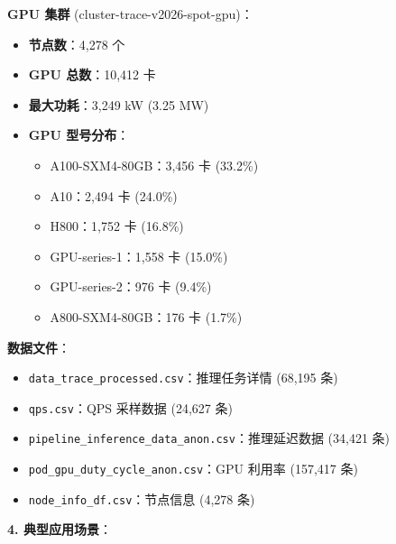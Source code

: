 \documentclass[12pt,a4paper]{article}
\begin{document}
\textbf{GPU 集群} (cluster-trace-v2026-spot-gpu)：
\begin{itemize}
    \item \textbf{节点数}：4,278 个
    \item \textbf{GPU 总数}：10,412 卡
    \item \textbf{最大功耗}：3,249 kW (3.25 MW)
    \item \textbf{GPU 型号分布}：
    \begin{itemize}
        \item A100-SXM4-80GB：3,456 卡 (33.2\%)
        \item A10：2,494 卡 (24.0\%)
        \item H800：1,752 卡 (16.8\%)
        \item GPU-series-1：1,558 卡 (15.0\%)
        \item GPU-series-2：976 卡 (9.4\%)
        \item A800-SXM4-80GB：176 卡 (1.7\%)
    \end{itemize}
\end{itemize}

\textbf{数据文件}：
\begin{itemize}
    \item \texttt{data\_trace\_processed.csv}：推理任务详情 (68,195 条)
    \item \texttt{qps.csv}：QPS 采样数据 (24,627 条)
    \item \texttt{pipeline\_inference\_data\_anon.csv}：推理延迟数据 (34,421 条)
    \item \texttt{pod\_gpu\_duty\_cycle\_anon.csv}：GPU 利用率 (157,417 条)
    \item \texttt{node\_info\_df.csv}：节点信息 (4,278 条)
\end{itemize}

\textbf{4. 典型应用场景}：
\end{document}
